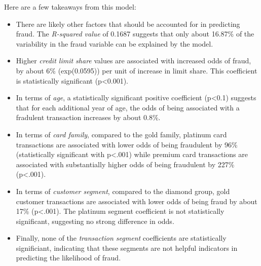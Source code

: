 \documentclass[
  letterpaper,
  DIV=11,
  numbers=noendperiod]{scrartcl}
\providecommand{\tightlist}{%
  \setlength{\itemsep}{0pt}\setlength{\parskip}{0pt}}\usepackage{longtable,booktabs,array}
\begin{document}
Here are a few takeaways from this model:

\begin{itemize}
\tightlist
\item
  There are likely other factors that should be accounted for in
  predicting fraud. The \emph{R-squared value} of 0.1687 suggests that
  only about 16.87\% of the variability in the fraud variable can be
  explained by the model.
\item
  Higher \emph{credit limit share} values are associated with increased
  odds of fraud, by about 6\% (exp(0.0595)) per unit of increase in
  limit share. This coefficient is statistically significant
  (p\textless0.001).
\item
  In terms of \emph{age}, a statistically significant positive
  coefficient (p\textless0.1) suggests that for each additional year of
  age, the odds of being associated with a fradulent transaction
  increases by about 0.8\%.
\item
  In terms of \emph{card family}, compared to the gold family, platinum
  card transactions are associated with lower odds of being fraudulent
  by 96\% (statistically significant with p\textless.001) while premium
  card transactions are associated with substantially higher odds of
  being fraudulent by 227\% (p\textless.001).
\item
  In terms of \emph{customer segment}, compared to the diamond group,
  gold customer transactions are associated with lower odds of being
  fraud by about 17\% (p\textless.001). The platinum segment coefficient
  is not statistically significant, suggesting no strong difference in
  odds.
\item
  Finally, none of the \emph{transaction segment} coefficients are
  statistically significiant, indicating that these segments are not
  helpful indicators in predicting the likelihood of fraud.
\end{itemize}
\end{document}
